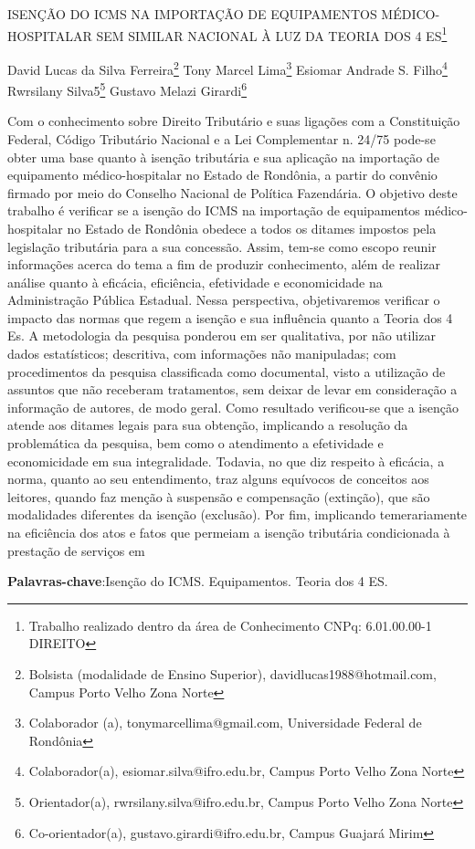 \documentclass[article,12pt,onesidea,4paper,english,brazil]{abntex2}
\begin{document}
	
	
	\frenchspacing 
	
	\begin{center}
		\LARGE ISENÇÃO DO ICMS NA IMPORTAÇÃO DE EQUIPAMENTOS MÉDICO-
		HOSPITALAR SEM SIMILAR NACIONAL À LUZ DA TEORIA DOS 4 ES\footnote{Trabalho realizado dentro da área de Conhecimento CNPq: 6.01.00.00-1 DIREITO}
		
		\normalsize
	David Lucas da Silva Ferreira\footnote{Bolsista (modalidade de Ensino Superior), davidlucas1988@hotmail.com, Campus Porto Velho Zona
		Norte} 
	Tony Marcel Lima\footnote{Colaborador (a), tonymarcellima@gmail.com, Universidade Federal de Rondônia} 
	Esiomar Andrade S. Filho\footnote{Colaborador(a), esiomar.silva@ifro.edu.br, Campus Porto Velho Zona Norte} 
	Rwrsilany Silva5\footnote{Orientador(a), rwrsilany.silva@ifro.edu.br, Campus Porto Velho Zona Norte}
	Gustavo Melazi Girardi\footnote{Co-orientador(a), gustavo.girardi@ifro.edu.br, Campus Guajará Mirim}  
	\end{center}
	
	\noindent Com o conhecimento sobre Direito Tributário e suas ligações com a Constituição
	Federal, Código Tributário Nacional e a Lei Complementar n. 24/75 pode-se obter
	uma base quanto à isenção tributária e sua aplicação na importação de equipamento
	médico-hospitalar no Estado de Rondônia, a partir do convênio firmado por meio do
	Conselho Nacional de Política Fazendária. O objetivo deste trabalho é verificar se a
	isenção do ICMS na importação de equipamentos médico-hospitalar no Estado de
	Rondônia obedece a todos os ditames impostos pela legislação tributária para a sua
	concessão. Assim, tem-se como escopo reunir informações acerca do tema a fim de
	produzir conhecimento, além de realizar análise quanto à eficácia, eficiência,
	efetividade e economicidade na Administração Pública Estadual. Nessa perspectiva,
	objetivaremos verificar o impacto das normas que regem a isenção e sua influência
	quanto a Teoria dos 4 Es. A metodologia da pesquisa ponderou em ser qualitativa,
	por não utilizar dados estatísticos; descritiva, com informações não manipuladas;
	com procedimentos da pesquisa classificada como documental, visto a utilização de
	assuntos que não receberam tratamentos, sem deixar de levar em consideração a
	informação de autores, de modo geral. Como resultado verificou-se que a isenção
	atende aos ditames legais para sua obtenção, implicando a resolução da
	problemática da pesquisa, bem como o atendimento a efetividade e economicidade
	em sua integralidade. Todavia, no que diz respeito à eficácia, a norma, quanto ao
	seu entendimento, traz alguns equívocos de conceitos aos leitores, quando faz
	menção à suspensão e compensação (extinção), que são modalidades diferentes da
	isenção (exclusão). Por fim, implicando temerariamente na eficiência dos atos e
	fatos que permeiam a isenção tributária condicionada à prestação de serviços em
	
	\vspace{\onelineskip}
	
	\noindent
	\textbf{Palavras-chave}:Isenção do ICMS. Equipamentos. Teoria dos 4 ES.
	
\end{document}

